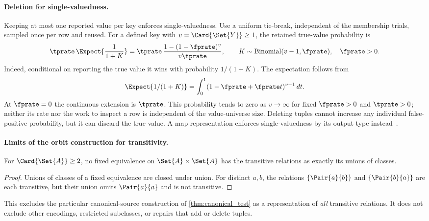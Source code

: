 \documentclass[ ../main.tex]{subfiles}
\begin{document}
\paragraph{Deletion for single-valuedness.}
Keeping at most one reported value per key enforces single-valuedness.
Use a uniform tie-break, independent of the membership trials, sampled once per
row and reused. For a defined key with $v=\Card{\Set{Y}}\ge1$, the retained
true-value probability is
\begin{equation}
 \tprate\,\Expect{\frac1{1+K}}
 =\tprate\,\frac{1-(1-\fprate)^v}{v\fprate},
 \qquad K\sim\operatorname{Binomial}(v-1,\fprate),\quad\fprate>0.
\end{equation}
Indeed, conditional on reporting the true value it wins with probability
$1/(1+K)$. The expectation follows from
\[
 \Expect{1/(1+K)}=\int_0^1(1-\fprate+\fprate t)^{v-1}\,dt.
\]
At $\fprate=0$ the continuous extension is $\tprate$. This probability tends
to zero as $v\to\infty$ for fixed $\fprate>0$ and $\tprate>0$; neither its
rate nor the work to inspect a row is independent of the value-universe size.
Deleting tuples cannot increase any individual false-positive probability,
but it can discard the true value. A map representation enforces
single-valuedness by its output type instead~\cite{bernoulliMaps}.

\paragraph{Limits of the orbit construction for transitivity.}
\begin{lemma}
\label{lem:no_quotient}
For $\Card{\Set{A}}\ge2$, no fixed equivalence on $\Set{A}\times\Set{A}$ has
the transitive relations as exactly its unions of classes.
\end{lemma}
\begin{proof}
Unions of classes of a fixed equivalence are closed under union. For distinct
$a,b$, the relations $\{\Pair{a}{b}\}$ and $\{\Pair{b}{a}\}$ are each
transitive, but their union omits $\Pair{a}{a}$ and is not transitive.
\end{proof}

This excludes the particular canonical-source construction of
\cref{thm:canonical_test} as a representation of \emph{all} transitive
relations. It does not exclude other encodings, restricted subclasses, or
repairs that add or delete tuples.
\end{document}
